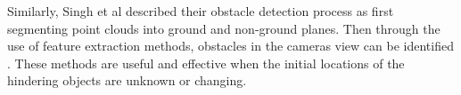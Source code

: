 Similarly,  Singh et al described their obstacle detection process as first segmenting point clouds into ground and non-ground planes. Then through the use of feature extraction methods, obstacles in the cameras view can be identified \cite{Singh2017}. These methods are useful and effective when the initial locations of the hindering objects are unknown or changing.







